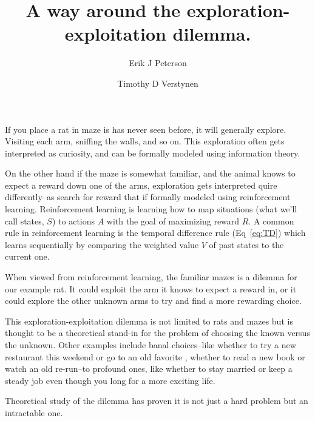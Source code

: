\documentclass[9pt,twocolumn,twoside]{pnas-new}
\title{A way around the exploration-exploitation dilemma.}
\author[a,1]{Erik J Peterson}
\author[a,b]{Timothy D Verstynen}
\affil[a]{Department of Psychology}
\affil[b]{Center for the Neural Basis of Cognition, Carnegie Mellon University, Pittsburgh PA}
\begin{document}
\verticaladjustment{-2pt}
\maketitle


\thispagestyle{firststyle}
If you place a rat in maze is has never seen before, it will generally explore. Visiting each arm, sniffing the walls, and so on. This exploration often gets interpreted as curiosity, and can be formally modeled using information theory. 

On the other hand if the maze is somewhat familiar, and the animal knows to expect a reward down one of the arms, exploration gets interpreted quire differently--as search for reward that if formally modeled using reinforcement learning. Reinforcement learning is learning how to map situations (what we'll call states, $S$) to actions $A$ with the goal of maximizing reward $R$. A common rule in reinforcement learning is the temporal difference rule (Eq~\ref{eq:TD}) which learns sequentially by comparing the weighted value $V$ of past states to the current one.


When viewed from reinforcement learning, the familiar mazes is a dilemma for our example rat. It could exploit the arm it knows to expect a reward in, or it could explore the other unknown arms to try and find a more rewarding choice.

This exploration-exploitation dilemma is not limited to rats and mazes but is thought to be a theoretical stand-in for the problem of choosing the known versus the unknown. Other examples include banal choices--like whether to try a new restaurant this weekend or go to an old favorite \cite{Schulz2018a}, whether to read a new book or watch an old re-run--to profound ones, like whether to stay married or keep a steady job even though you long for a more exciting life.

Theoretical study of the dilemma has proven it is not just a hard problem but an intractable one.
\end{document}

